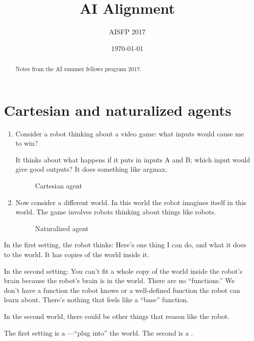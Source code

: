 \documentclass[11pt]{article}
\begin{document}
\title{AI Alignment}

\author{AISFP 2017}

\date{\today}
\maketitle
\begin{abstract}
Notes from the AI summer fellows program 2017.
\end{abstract}

\tableofcontents

\section{Cartesian and naturalized agents}

\begin{enumerate}
\item
Consider a robot thinking about a video game: what inputs would cause me to win?

It thinks about what happens if it puts in inputs A and B; which input would give good outputs? It does something like argmax. 

\begin{figure}
\caption{Cartesian agent}
\end{figure}
\item
Now consider a different world. In this world the robot imagines itself in this world. The game involves robots thinking about things like robots.

\begin{figure}[h!]
\caption{Naturalized agent}
\end{figure}
\end{enumerate}
In the first setting, the robot thinks: Here's one thing I can do, and what it does to the world. It has copies of the world inside it. 

In the second setting: You can't fit a whole copy of the world inside the robot's brain because the robot's brain is in the world. There are no ``functions.'' We don't have a function the robot knows or a well-defined function the robot can learn about. There's nothing that feels like a ``base'' function.

In the second world, there could be other things that reason like the robot.

The first setting is a ---``plug into'' the world. The second is a . 
\end{document}
